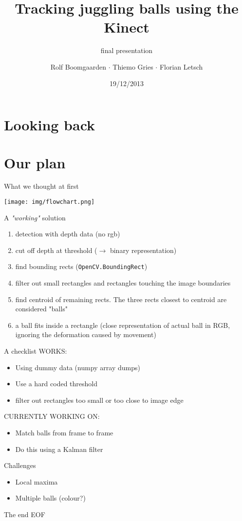 \documentclass{beamer}
\title{Tracking juggling balls using the Kinect}
\subtitle{final presentation}
\author[Rolf $\cdot$ Thiemo $\cdot$ Flo]{Rolf Boomgaarden $\cdot$ Thiemo Gries $\cdot$ Florian Letsch}
\institute{Universität Hamburg}
\date{19/12/2013}
\begin{document}
\frame
{
\titlepage
}
\section{Looking back}

\section{Our plan}
\begin{frame}{What we thought at first}
\begin{center}\texttt{[image: img/flowchart.png]}\end{center}
\end{frame}

\begin{frame}{A \textit{"working"} solution}
\begin{enumerate}
	\item detection with depth data (no rgb)
	\item cut off depth at threshold ($\rightarrow$ binary representation)
	\item find bounding rects (\lstinline{OpenCV.BoundingRect})
	\item filter out small rectangles and rectangles touching the image boundaries
	\item find centroid of remaining rects. The three rects closest to centroid are considered "balls"
	\item a ball fits inside a rectangle (close representation of actual ball in RGB, ignoring the deformation caused by movement)
\end{enumerate}
\end{frame}


\begin{frame}{A checklist}
WORKS:

\begin{itemize}
\item Using dummy data (numpy array dumps)\\
\item Use a hard coded threshold\\
\item filter out rectangles too small or too close to image edge
\end{itemize}

CURRENTLY WORKING ON:

\begin{itemize}
 \item Match balls from frame to frame
 \item Do this using a Kalman filter
\end{itemize}

\end{frame}



\begin{frame}{Challenges}
\begin{itemize}
	\item Local maxima
	\item Multiple balls (colour?)
\end{itemize}
\end{frame}

\begin{frame}{The end}
EOF
\end{frame}
\end{document}
